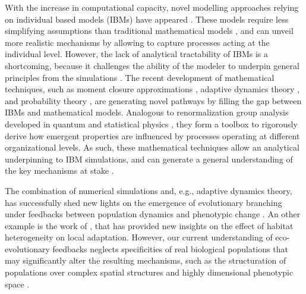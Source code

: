 With the increase in computational capacity, novel modelling approaches relying on individual based models (IBMs) have appeared \citep{deangelis2005individual}. These models require less simplifying assumptions than traditional mathematical models \citep{deangelis2005individual}, and can unveil more realistic mechanisms by allowing to capture processes acting at the individual level. However, the lack of analytical tractability of IBMs is a shortcoming, because it challenges the ability of the modeler to underpin general principles from the simulations \citep{Lion2016,May2004}.
% 
The recent development of mathematical techniques, such as moment closure approximations \citep{law1999moment,Gandhi2000,Nordbotten2020,Lion2016}, adaptive dynamics theory \citep{Metz1995}, and probability theory \citep{Champagnat2006}, are generating novel pathways by filling the gap between IBMs and mathematical models. 
% 
% 
Analogous to renormalization group analysis developed in quantum and statistical physics \citep{Sayama}, they form a toolbox to rigorously derive how emergent properties are influenced by processes operating at different organizational levels. As such, these mathematical techniques allow an analytical underpinning to IBM simulations, and can generate a general understanding of the key mechanisms at stake \citep{Lion2016}.

The combination of numerical simulations and, e.g., adaptive dynamics theory, has successfully shed new lights on the emergence of evolutionary branching under feedbacks between population dynamics and phenotypic change \citep{Dieckmann1999,Doebeli2003}.
%
An other example is the work of \cite{Meszena1997,Debarre2013, Mirrahimi2020}, that has provided new insights on the effect of habitat heterogeneity on local adaptation. 
% 
However, our current understanding of eco-evolutionary feedbacks neglects specificities of real biological populations that may significantly alter the resulting mechanisms, such as the structuration of populations over complex spatial structures \citep{Nowak2001a} and highly dimensional phenotypic space \citep{Doebeli2010}.


